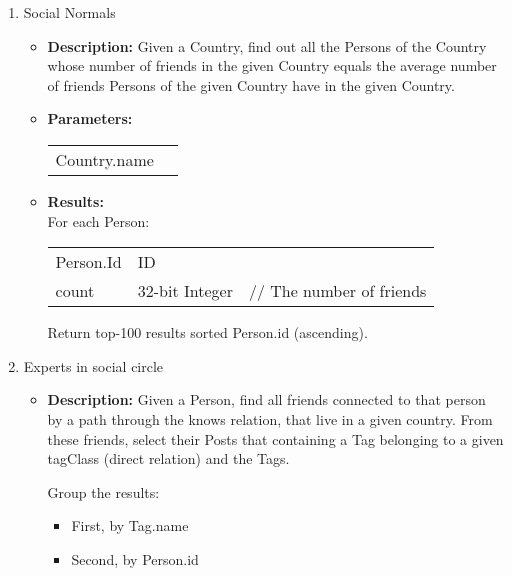 {\begin{enumerate}
      \item Social Normals 
            \begin{itemize}
                \item \textbf{Description:}
                  Given a Country, find out all the Persons of the Country whose number of friends in the given Country
                  equals the average number of friends Persons of the given Country have in the given Country.
                \item \textbf{Parameters:} \\
                    \begin{tabular}{ll}
                      Country.name & \\
                    \end{tabular}
                \item \textbf{Results:} \\
                   For each Person:
                    \begin{tabular}{lll}
                      Person.Id & ID & \\
                      count & 32-bit Integer & \parbox[t]{20cm}{ // The number of friends \strut} \\ 
                    \end{tabular}
                    Return top-100 results sorted Person.id (ascending).
                    \end{itemize}

      \item Experts in social circle 
            \begin{itemize}
                \item \textbf{Description:}
                  Given a Person, find all friends connected to that person by a path through the knows relation, that
                  live in a given country. From these friends, select their Posts that containing a Tag belonging to a
                  given tagClass (direct relation) and the Tags.

                  Group the results:
                  \begin{itemize}
                      \item First, by Tag.name
                      \item Second, by Person.id
                  \end{itemize}


\end{itemize}
\end{enumerate}}
